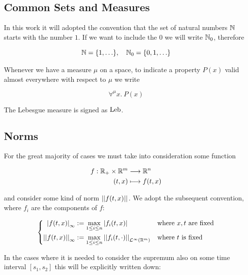 \label{app:notation}

\subsection{Common Sets and Measures}

In this work it will adopted the convention that the set of natural numbers $\N$ starts with the number $1$.
If we want to include the $0$ we will write $\N_0$, therefore

\begin{equation*}
	\N = \{1, \ldots\}, 
	\quad
	\N_0 = \{0,1,\ldots\}
\end{equation*}

Whenever we have a measure $\mu$ on a space, to indicate a property $P(x)$ valid almost everywhere with respect to $\mu$ we write 

\begin{equation*}
	\forall^{\mu}x.\
		P(x)
\end{equation*}

The Lebesgue measure is signed as $\lebsge$.

\subsection{Norms}

For the great majority of cases we must take into consideration some function

\begin{align*}
	f: \R_+ \times \R^m 	&\longrightarrow		\R^n
	\\
	(t, x) 						&\longmapsto				f(t,x)
\end{align*}

and consider some kind of norm $\Normp{}{f(t,x)}$.
We adopt the subsequent convention, where $f_i$ are the components of $f$:

\begin{equation*}
	\left\{
	\begin{aligned}
		\normp{\infty}{f(t,x)} &:= \max_{1 \leq i \leq n} \normp{}{f_i(t,x)}		&& \text{where $x,t$ are fixed}
		\\
		\Normp{\infty}{f(t,x)} &:=  \max_{1 \leq i \leq n} \Normp{\Lpspace^\infty(\R^m)}{f_i(t,\cdot)}			&& \text{where $t$ is fixed}
	\end{aligned}
	\right.
\end{equation*}

In the cases where it is needed to consider the supremum also on some time interval $[s_1,s_2]$ this will be explicitly written down:

